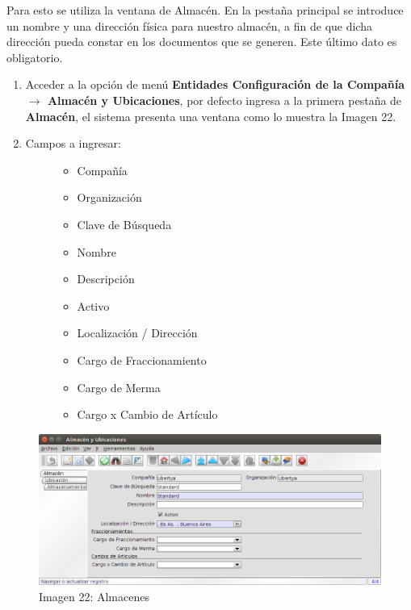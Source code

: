 \documentclass[letterpaper,10pt,spanish]{sphinxmanual}
\begin{document}
Para esto se utiliza la ventana de Almacén. En la pestaña principal se introduce un nombre y una dirección física para nuestro almacén, a fin de que dicha dirección pueda constar en los documentos que se generen. Este último dato es obligatorio.
\begin{enumerate}
\item {} 
Acceder a la opción de menú \textbf{Entidades Configuración de la Compañía \(\rightarrow\) Almacén y Ubicaciones}, por defecto ingresa a la primera pestaña de \textbf{Almacén}, el sistema presenta una ventana como lo muestra la Imagen 22.

\item {} \begin{description}
\item[{Campos a ingresar:}] \leavevmode\begin{itemize}
\item {} 
Compañía

\item {} 
Organización

\item {} 
Clave de Búsqueda

\item {} 
Nombre

\item {} 
Descripción

\item {} 
Activo

\item {} 
Localización / Dirección

\item {} 
Cargo de Fraccionamiento

\item {} 
Cargo de Merma

\item {} 
Cargo x Cambio de Artículo

\end{itemize}

\end{description}

\end{enumerate}
\begin{figure}[htbp]
\centering
\capstart

\includegraphics{ly_alm1.png}
\caption{Imagen 22: Almacenes}\end{figure}
\end{document}
